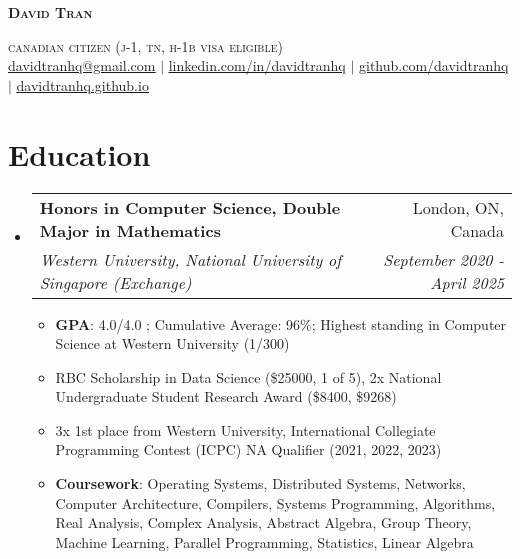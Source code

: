 \documentclass[letterpaper,10pt]{article}
\makeatletter
\newcommand{\resumeItem}[1]{
  \item\small{
    {#1 \vspace{-2pt}}
  }
}
\newcommand{\resumeSubheading}[4]{
  \vspace{-2pt}\item
    \begin{tabular*}{0.97\textwidth}[t]{l@{\extracolsep{\fill}}r}
      \textbf{#1} & #2 \\
      \textit{\small#3} & \textit{\small #4} \\
    \end{tabular*}\vspace{-7pt}
}
\newcommand{\resumeSubHeadingListStart}{\begin{itemize}[leftmargin=0.15in, label={}]}
\newcommand{\resumeSubHeadingListEnd}{\end{itemize}}
\newcommand{\resumeItemListStart}{\begin{itemize}}
\newcommand{\resumeItemListEnd}{\end{itemize}\vspace{-5pt}}
\makeatother
\begin{document}

\begin{center}
    \textbf{\Huge \scshape David Tran} \\ \vspace{1pt}

    \textsc{canadian citizen (j-1, tn, h-1b visa eligible)} \\
    \href{mailto:davidtranhq@gmail.com}{\underline{davidtranhq@gmail.com}} $|$
    \href{https://www.linkedin.com/in/davidtranhq}{\underline{linkedin.com/in/davidtranhq}} $|$
    \href{https://github.com/davidtranhq}{\underline{github.com/davidtranhq}} $|$
    \href{https://davidtranhq.github.io}{\underline{davidtranhq.github.io}}
\end{center}


\section{Education}
\resumeSubHeadingListStart
  \resumeSubheading
    {Honors in Computer Science, Double Major in Mathematics}{London, ON, Canada}
    {Western University, National University of Singapore (Exchange)}{September 2020 - April 2025}
    \resumeItemListStart
      \resumeItem{\textbf{GPA}: 4.0/4.0 ; Cumulative Average: 96\%; Highest standing in Computer Science at Western University (1/300)}
      \resumeItem{RBC Scholarship in Data Science (\$25000, 1 of 5), 2x National Undergraduate Student Research Award (\$8400, \$9268)}
      \resumeItem{3x 1st place from Western University, International Collegiate Programming Contest (ICPC) NA Qualifier (2021, 2022, 2023)}
      \resumeItem{\textbf{Coursework}{: Operating Systems, Distributed Systems, Networks, Computer Architecture, Compilers, Systems Programming, Algorithms, Real Analysis, Complex Analysis, Abstract Algebra, Group Theory, Machine Learning, Parallel Programming, Statistics, Linear Algebra }}

      \resumeItemListEnd
    \resumeSubHeadingListEnd
\end{document}
